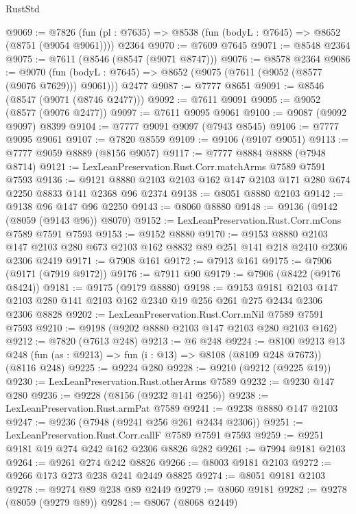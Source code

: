 \begin{lexlean}{RustStd}
\begin{coremodule}
{\begin{coremodule}
{{{{{{{{{{{{{{{{{{{{{{{{{{{{{{{{{{@9069 := @7826
    (fun (pl : @7635) => @8538 (fun (bodyL : @7645) => @8652 (@8751 (@9054 @9061))))
    @2364
@9070 := @7609 @7645
@9071 := @8548 @2364
@9075 := @7611 (@8546 (@8547 (@9071 @8747)))
@9076 := @8578 @2364
@9086 := @9070
    (fun (bodyL : @7645) => @8652 (@9075 (@7611 (@9052 (@8577 (@9076 @7629))) @9061)))
    @2477
@9087 := @7777 @8651
@9091 := @8546 (@8547 (@9071 (@8746 @2477)))
@9092 := @7611 @9091
@9095 := @9052 (@8577 (@9076 @2477))
@9097 := @7611 @9095 @9061
@9100 := @9087 (@9092 @9097) @8399
@9104 := @7777 @9091 @9097 (@7943 @8545)
@9106 := @7777 @9095 @9061
@9107 := @7820 @8559
@9109 := @9106 (@9107 @9051)
@9113 := @7777 @9059 @8889 (@8156 @9057)
@9117 := @7777 @8884 @8888 (@7948 @8714)
@9121 := LexLeanPreservation.Rust.Corr.matchArms @7589 @7591 @7593
@9136 := @9121 @8880 @2103 @2103 @162 @147 @2103 @171 @280 @674 @2250 @8833 @141 @2368 @96 @2374
@9138 := @8051 @8880 @2103
@9142 := @9138 @96 @147 @96 @2250
@9143 := @8060 @8880
@9148 := @9136 (@9142 (@8059 (@9143 @96)) @8070)
@9152 := LexLeanPreservation.Rust.Corr.mCons @7589 @7591 @7593
@9153 := @9152 @8880
@9170 := @9153
    @8880
    @2103
    @147
    @2103
    @280
    @673
    @2103
    @162
    @8832
    @89
    @251
    @141
    @218
    @2410
    @2306
    @2306
    @2419
@9171 := @7908 @161
@9172 := @7913 @161
@9175 := @7906 (@9171 (@7919 @9172))
@9176 := @7911 @90
@9179 := @7906 (@8422 (@9176 @8424))
@9181 := @9175 (@9179 @8880)
@9198 := @9153
    @9181
    @2103
    @147
    @2103
    @280
    @141
    @2103
    @162
    @2340
    @19
    @256
    @261
    @275
    @2434
    @2306
    @2306
    @8828
@9202 := LexLeanPreservation.Rust.Corr.mNil @7589 @7591 @7593
@9210 := @9198 (@9202 @8880 @2103 @147 @2103 @280 @2103 @162)
@9212 := @7820 (@7613 @248)
@9213 := @6 @248
@9224 := @8100
    @9213
    @13
    @248
    (fun (as : @9213) => fun (i : @13) => @8108 (@8109 @248 @7673))
    (@8116 @248)
@9225 := @9224 @280
@9228 := @9210 (@9212 (@9225 @19))
@9230 := LexLeanPreservation.Rust.otherArms @7589
@9232 := @9230 @147 @280
@9236 := @9228 (@8156 (@9232 @141 @256))
@9238 := LexLeanPreservation.Rust.armPat @7589
@9241 := @9238 @8880 @147 @2103
@9247 := @9236 (@7948 (@9241 @256 @261 @2434 @2306))
@9251 := LexLeanPreservation.Rust.Corr.callF @7589 @7591 @7593
@9259 := @9251 @9181 @19 @274 @242 @162 @2306 @8826 @282
@9261 := @7994 @9181 @2103
@9264 := @9261 @274 @242 @8826
@9266 := @8003 @9181 @2103
@9272 := @9266 @173 @273 @238 @241 @2449 @8825
@9274 := @8051 @9181 @2103
@9278 := @9274 @89 @238 @89 @2449
@9279 := @8060 @9181
@9282 := @9278 (@8059 (@9279 @89))
@9284 := @8067 (@8068 @2449)
}}}}}}}}}}}}}}}}}}}}}}}}}}}}}}}}}}
\end{coremodule}}
\end{coremodule}
\end{lexlean}
